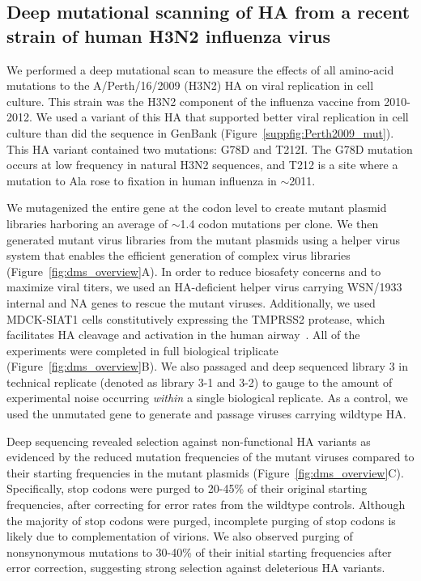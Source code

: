 \documentclass[11pt]{article}
\begin{document}
\subsection*{Deep mutational scanning of HA from a recent strain of human H3N2 influenza virus}
We performed a deep mutational scan to measure the effects of all amino-acid mutations to the A/Perth/16/2009 (H3N2) HA on viral replication in cell culture. 
This strain was the H3N2 component of the influenza vaccine from 2010-2012.
We used a variant of this HA that supported better viral replication in cell culture than did the sequence in GenBank (Figure~\ref{suppfig:Perth2009_mut}).
This HA variant contained two mutations: G78D and T212I.
The G78D mutation occurs at low frequency in natural H3N2 sequences, and T212 is a site where a mutation to Ala rose to fixation in human influenza in $\sim$2011.

We mutagenized the entire gene at the codon level to create mutant plasmid libraries harboring an average of $\sim$1.4 codon mutations per clone.
We then generated mutant virus libraries from the mutant plasmids using a helper virus system that enables the efficient generation of complex virus libraries~\citep{doud2016accurate} (Figure~\ref{fig:dms_overview}A).
In order to reduce biosafety concerns and to maximize viral titers, we used an HA-deficient helper virus carrying WSN/1933 internal and NA genes to rescue the mutant viruses.
Additionally, we used MDCK-SIAT1 cells constitutively expressing the TMPRSS2 protease, which facilitates HA cleavage and activation in the human airway~\citep{bottcher2006proteolytic, bottcher2010cleavage}.
All of the experiments were completed in full biological triplicate (Figure~\ref{fig:dms_overview}B). 
We also passaged and deep sequenced library 3 in technical replicate (denoted as library 3-1 and 3-2) to gauge to the amount of experimental noise occurring \textit{within} a single biological replicate.
As a control, we used the unmutated gene to generate and passage viruses carrying wildtype HA.

Deep sequencing revealed selection against non-functional HA variants as evidenced by the reduced mutation frequencies of the mutant viruses compared to their starting frequencies in the mutant plasmids (Figure~\ref{fig:dms_overview}C).
Specifically, stop codons were purged to 20-45\% of their original starting frequencies, after correcting for error rates from the wildtype controls.
Although the majority of stop codons were purged, incomplete purging of stop codons is likely due to complementation of virions. 
We also observed purging of nonsynonymous mutations to 30-40\% of their initial starting frequencies after error correction, suggesting strong selection against deleterious HA variants.
\end{document}
